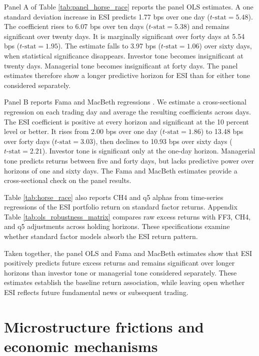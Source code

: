 \documentclass[12pt]{article}
\begin{document}
Panel A of Table \ref{tab:panel_horse_race} reports the panel OLS estimates. A one standard deviation increase in ESI predicts 1.77 bps over one day ($t\text{-stat} = 5.48$). The coefficient rises to 6.07 bps over ten days ($t\text{-stat} = 5.38$) and remains significant over twenty days. It is marginally significant over forty days at 5.54 bps ($t\text{-stat} = 1.95$). The estimate falls to 3.97 bps ($t\text{-stat} = 1.06$) over sixty days, when statistical significance disappears. Investor tone becomes insignificant at twenty days. Managerial tone becomes insignificant at forty days. The panel estimates therefore show a longer predictive horizon for ESI than for either tone considered separately.

Panel B reports Fama and MacBeth regressions \citep{fama1973risk}. We estimate a cross-sectional regression on each trading day and average the resulting coefficients across days. The ESI coefficient is positive at every horizon and significant at the 10 percent level or better. It rises from 2.00 bps over one day ($t\text{-stat} = 1.86$) to 13.48 bps over forty days ($t\text{-stat} = 3.03$), then declines to 10.93 bps over sixty days ($t\text{-stat} = 2.21$). Investor tone is significant only at the one-day horizon. Managerial tone predicts returns between five and forty days, but lacks predictive power over horizons of one and sixty days. The Fama and MacBeth estimates provide a cross-sectional check on the panel results.

Table \ref{tab:horse_race} also reports CH4 and q5 alphas from time-series regressions of the ESI portfolio return on standard factor returns. Appendix Table \ref{tab:ols_robustness_matrix} compares raw excess returns with FF3, CH4, and q5 adjustments across holding horizons. These specifications examine whether standard factor models absorb the ESI return pattern.

Taken together, the panel OLS and Fama and MacBeth estimates show that ESI positively predicts future excess returns and remains significant over longer horizons than investor tone or managerial tone considered separately. These estimates establish the baseline return association, while leaving open whether ESI reflects future fundamental news or subsequent trading.

\section{Microstructure frictions and economic mechanisms}\label{sec:mechanisms}
\end{document}
